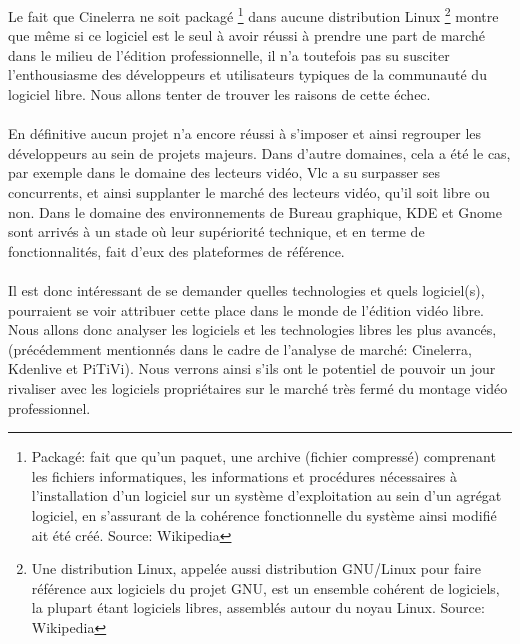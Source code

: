 
Le fait que Cinelerra ne soit packagé \footnote{Packagé: fait
que qu'un paquet, une archive (fichier compressé) comprenant les
fichiers informatiques, les informations et procédures nécessaires
à l'installation d'un logiciel sur un système d'exploitation au sein
d'un agrégat logiciel, en s'assurant de la cohérence fonctionnelle
du système ainsi modifié ait été créé. Source: Wikipedia} dans
aucune distribution Linux \footnote {Une distribution Linux, appelée
aussi distribution GNU/Linux pour faire référence aux logiciels du
projet GNU, est un ensemble cohérent de logiciels, la plupart étant
logiciels libres, assemblés autour du noyau Linux. Source: Wikipedia}
montre que même si ce logiciel est le seul à avoir réussi à prendre
une part de marché dans le milieu de l'édition professionnelle,
il n'a toutefois pas su susciter l'enthousiasme des développeurs et
utilisateurs typiques de la communauté du logiciel libre. Nous allons
tenter de trouver les raisons de cette échec.

\paragraph{}

En définitive aucun projet n'a encore réussi à s'imposer et ainsi
regrouper les développeurs au sein de projets majeurs. Dans d'autre
domaines, cela a été le cas, par exemple dans le domaine des lecteurs
vidéo, Vlc a su surpasser ses concurrents, et ainsi supplanter le
marché des lecteurs vidéo, qu'il soit libre ou non. Dans le domaine
des environnements de Bureau graphique, KDE et Gnome sont arrivés à un
stade où leur supériorité technique, et en terme de fonctionnalités,
fait d'eux des plateformes de référence.

\paragraph{}

Il est donc intéressant de se demander quelles technologies et quels
logiciel(s), pourraient se voir attribuer cette place dans le monde
de l'édition vidéo libre. Nous allons donc analyser les logiciels et
les technologies libres les plus avancés, (précédemment mentionnés
dans le cadre de l'analyse de marché: Cinelerra, Kdenlive et PiTiVi).
Nous verrons ainsi s'ils ont le potentiel de pouvoir un jour rivaliser
avec les logiciels propriétaires sur le marché très fermé du montage
vidéo professionnel.

